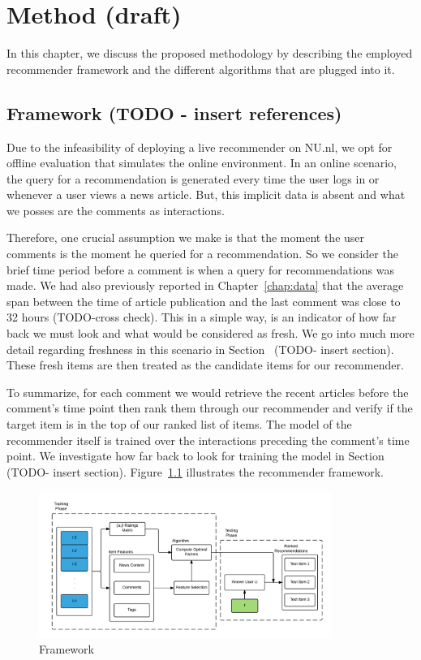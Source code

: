 \chapter{Method (draft)}
\label{chap:method}
In this chapter, we discuss the proposed methodology by describing the employed recommender framework and the different algorithms that are plugged into it.

\section{Framework (TODO - insert references)}
Due to the infeasibility of deploying a live recommender on NU.nl, we opt for offline evaluation that simulates the online environment. In an online scenario, the query for a recommendation is generated every time the user logs in or whenever a user views a news article. But, this implicit data is absent and what we posses are the comments as interactions.

Therefore, one crucial assumption we make is that the moment the user comments is the moment he queried for a recommendation. So we consider the brief time period before a comment is when a query for recommendations was made. We had also previously reported in Chapter~\ref{chap:data} that the average span between the time of article publication and the last comment was close to 32 hours (TODO-cross check). This in a simple way, is an indicator of how far back we must look and what would be considered as fresh. We go into much more detail regarding freshness in this scenario in Section~ (TODO- insert section). These fresh items are then treated as the candidate items for our recommender.

To summarize, for each comment we would retrieve the recent articles before the comment's time point then rank them through our recommender and verify if the target item is in the top of our ranked list of items. The model of the recommender itself is trained over the interactions preceding the comment's time point. We investigate how far back to look for training the model in Section~ (TODO- insert section). Figure~\ref{fig:frame} illustrates the recommender framework.

\begin{figure}[!h]
\centering
\includegraphics[width=0.85\textwidth]{c-method_images/frame.png}
\caption{Framework}
\label{fig:frame}
\end{figure}

